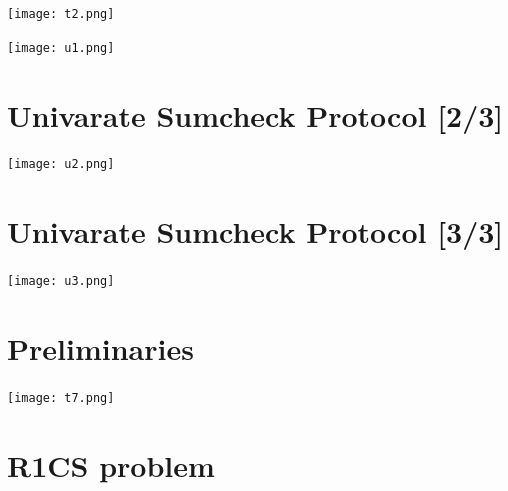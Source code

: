 \documentclass{beamer}
\begin{document}
\begin{frame}{}
	\begin{minipage}{0.42\linewidth}
		\texttt{[image: t2.png]}
	\end{minipage}
\end{frame}



\begin{frame}{}
\begin{minipage}{0.42\linewidth}
	\texttt{[image: u1.png]}
\end{minipage}
\end{frame}

\section{Univarate Sumcheck Protocol [2/3]}



\begin{frame}{}
	\begin{minipage}{0.42\linewidth}
		\texttt{[image: u2.png]}
	\end{minipage}
\end{frame}


\section{Univarate Sumcheck Protocol [3/3]}



\begin{frame}{}
	\begin{minipage}{0.42\linewidth}
		\texttt{[image: u3.png]}
	\end{minipage}
\end{frame}

\section{Preliminaries}

\begin{frame}{}
\begin{minipage}{0.42\linewidth}
	\texttt{[image: t7.png]}
\end{minipage}
\end{frame}



\section{R1CS problem}
\end{document}
